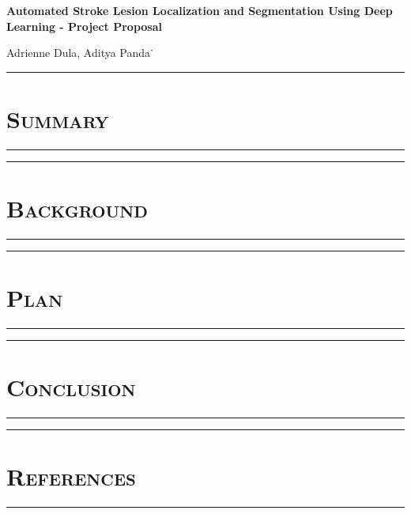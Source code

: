 \documentclass[10pt]{article} %
\begin{document}
\begin{center}
{\bf Automated Stroke Lesion Localization and Segmentation Using Deep Learning - Project Proposal} %
\end{center}

\begin{center}
Adrienne Dula, Aditya Panda˙
\end{center}

\begin{center}
    \par\noindent\rule{\textwidth}{0.2pt}
    \section*{\textsc{\textmd{Summary}}}
    \par\noindent\rule{\textwidth}{0.2pt}
\end{center}


\begin{center}
    \par\noindent\rule{\textwidth}{0.2pt}
    \section*{\textsc{\textmd{Background}}}
    \par\noindent\rule{\textwidth}{0.2pt}
\end{center}


\begin{center}
    \par\noindent\rule{\textwidth}{0.2pt}
    \section*{\textsc{\textmd{Plan}}}
    \par\noindent\rule{\textwidth}{0.2pt}
\end{center}


\begin{center}
    \par\noindent\rule{\textwidth}{0.2pt}
    \section*{\textsc{\textmd{Conclusion}}}
    \par\noindent\rule{\textwidth}{0.2pt}
\end{center}


\begin{center}
    \par\noindent\rule{\textwidth}{0.2pt}
    \section*{\textsc{\textmd{References}}}
    \par\noindent\rule{\textwidth}{0.2pt}
\end{center}

\begingroup
\renewcommand{\section}[2]{}%


\endgroup
\end{document}
